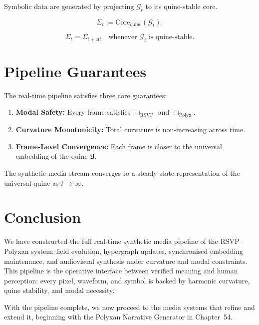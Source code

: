 Symbolic data are generated by projecting $\mathcal{G}_t$ to its quine-stable
core.

\begin{definition}
\[
\Sigma_t := \mathrm{Core}_{\mathrm{quine}}(\mathcal{G}_t).
\]
\end{definition}

\begin{theorem}
\[
\Sigma_t = \Sigma_{t+\Delta t}
\quad\text{whenever $\mathcal{G}_t$ is quine-stable.}
\]
\end{theorem}


\section{Pipeline Guarantees}
\label{sec:53:guarantees}

The real-time pipeline satisfies three core guarantees:

\begin{enumerate}
  \item \textbf{Modal Safety:}
        Every frame satisfies $\Box_{\mathrm{RSVP}}$ and $\Box_{\mathrm{Polyx}}$.
  \item \textbf{Curvature Monotonicity:}
        Total curvature is non-increasing across time.
  \item \textbf{Frame-Level Convergence:}
        Each frame is closer to the universal embedding of the quine $\mathfrak{U}$.
\end{enumerate}

\begin{theorem}
The synthetic media stream converges to a steady-state representation of the
universal quine as $t\to\infty$.
\end{theorem}


\section{Conclusion}
\label{sec:53:conclusion}

We have constructed the full real-time synthetic media pipeline of the
RSVP--Polyxan system: field evolution, hypergraph updates, synchronised
embedding maintenance, and audiovisual synthesis under curvature and modal
constraints.  
This pipeline is the operative interface between verified meaning and human
perception: every pixel, waveform, and symbol is backed by harmonic curvature,
quine stability, and modal necessity.

With the pipeline complete, we now proceed to the media systems that refine and
extend it, beginning with the Polyxan Narrative Generator in Chapter~54.

